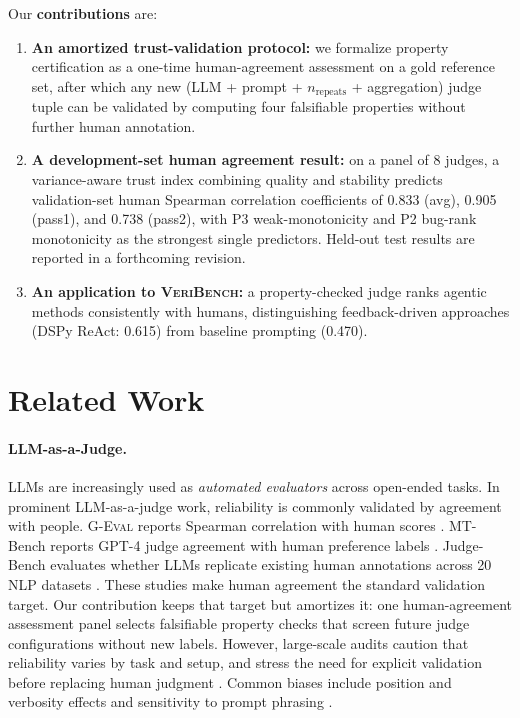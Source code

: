 \documentclass{article}
\begin{document}
Our \textbf{contributions} are:
\begin{enumerate}
  \item \textbf{An amortized trust-validation protocol:} we formalize property certification as a one-time human-agreement assessment on a gold reference set, after which any new (LLM + prompt + \(n_\text{repeats}\) + aggregation) judge tuple can be validated by computing four falsifiable properties without further human annotation.
  \item \textbf{A development-set human agreement result:} on a panel of 8 judges, a variance-aware trust index combining quality and stability predicts validation-set human Spearman correlation coefficients of 0.833 (avg), 0.905 (pass1), and 0.738 (pass2), with P3 weak-monotonicity and P2 bug-rank monotonicity as the strongest single predictors. Held-out test results are reported in a forthcoming revision.
  \item \textbf{An application to \textsc{VeriBench}:} a property-checked judge ranks agentic methods consistently with humans, distinguishing feedback-driven approaches (DSPy ReAct: 0.615) from baseline prompting (0.470).
\end{enumerate}

\section{Related Work}
\paragraph{LLM-as-a-Judge.}
LLMs are increasingly used as \emph{automated evaluators} across open-ended tasks.
In prominent LLM-as-a-judge work, reliability is commonly validated by agreement with people.
\textsc{G-Eval} reports Spearman correlation with human scores \citep{Liu2023GEval}.
MT-Bench reports GPT-4 judge agreement with human preference labels \citep{Zheng2023MTBench}.
Judge-Bench evaluates whether LLMs replicate existing human annotations across 20 NLP datasets \citep{Kocmi2024HumanVsLLM}.
These studies make human agreement the standard validation target.
Our contribution keeps that target but amortizes it: one human-agreement assessment panel selects falsifiable property checks that screen future judge configurations without new labels.
However, large-scale audits caution that reliability varies by task and setup, and stress the need for explicit validation before replacing human judgment \citep{Kocmi2024HumanVsLLM,Li2024TrustLLMJudgments}.
Common biases include position and verbosity effects and sensitivity to prompt phrasing \citep{Zheng2023MTBench,Li2024TrustLLMJudgments}.
\end{document}

